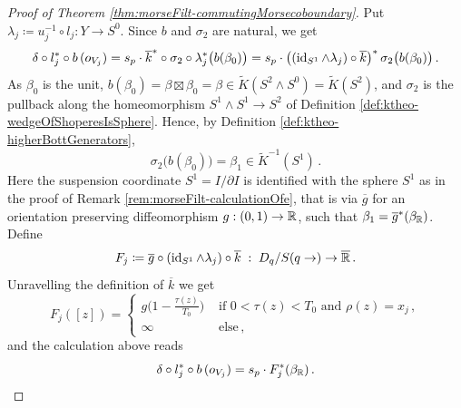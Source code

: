 \begin{proof}[Proof of Theorem \ref{thm:morseFilt-commutingMorsecoboundary}]
Put $\lambda_j\coloneq u_j^{-1}\circ l_j:Y\to S^0$. Since $b$ and $\sigma_2$ are natural, we get
\begin{equation*}
	\delta\circ l_j^*\circ b\,(o_{V_j})
	=s_p\cdot \overline{k}^*\circ\sigma_2\circ\lambda_j^*\big(b(\beta_0)\big)
	=s_p\cdot \big((\operatorname{\mathrm{id}}_{S^1}\wedge\lambda_j)\circ\overline{k}\big)^*\,\sigma_2\big(b(\beta_0)\big)\,.
\end{equation*}
As $\beta_0$ is the unit, $b(\beta_0)=\beta\boxtimes\beta_0=\beta\in\tilde{K}(S^2\wedge S^0)=\tilde{K}(S^2)$, and $\sigma_2$ is the pullback along the homeomorphism $S^1\wedge S^1\to S^2$ of Definition \ref{def:ktheo-wedgeOfShoperesIsSphere}. Hence, by Definition \ref{def:ktheo-higherBottGenerators},
\begin{equation*}
	\sigma_2\big(b(\beta_0)\big)=\beta_1\in\tilde{K}^{-1}(S^1)\,.
\end{equation*}
Here the suspension coordinate $S^1=I/\partial I$ is identified with the sphere $S^1$ as in the proof of Remark \ref{rem:morseFilt-calculationOfe}, that is via $\overline{g}$ for an orientation preserving diffeomorphism $g:(0,1)\to\mathbb{R}$, such that $\beta_1=\overline{g}^*(\beta_{\mathbb{R}})$. Define
\begin{equation*}
	F_j\coloneq \overline{g}\circ(\operatorname{\mathrm{id}}_{S^1}\wedge\lambda_j)\circ\overline{k}\;:\;D_q/S(q\to)\to\overline{\mathbb{R}}\,.
\end{equation*}
Unravelling the definition of $\overline{k}$ we get
\begin{equation*}
	F_j([z])=\begin{cases}
		g\Big(1-\frac{\tau(z)}{T_0}\Big) & \text{ if } 0<\tau(z)<T_0 \text{ and } \rho(z)=x_j\,,\\
		\infty & \text{ else}\,,
	\end{cases}
\end{equation*}
and the calculation above reads
\begin{equation*}
	\delta\circ l_j^*\circ b\,(o_{V_j})=s_p\cdot F_j^*(\beta_{\mathbb{R}})\,.
\end{equation*}
 

\end{proof}
